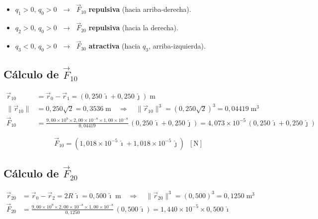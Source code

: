 \documentclass[12pt,letterpaper]{article}
\begin{document}
\begin{itemize}
    \item $q_1 > 0$, $q_0 > 0$ $\;\to\;$ $\vec{F}_{10}$ \textbf{repulsiva} (hacia arriba-derecha).
    \item $q_2 > 0$, $q_0 > 0$ $\;\to\;$ $\vec{F}_{20}$ \textbf{repulsiva} (hacia la derecha).
    \item $q_3 < 0$, $q_0 > 0$ $\;\to\;$ $\vec{F}_{30}$ \textbf{atractiva} (hacia $q_3$,
          arriba-izquierda).
\end{itemize}

\subsection*{C\'alculo de $\vec{F}_{10}$}

\begin{align*}
    \vec{r}_{10} &= \vec{r}_0 - \vec{r}_1 = (0{,}250\,\hat{\imath}+0{,}250\,\hat{\jmath})\;\text{m}\\
    \|\vec{r}_{10}\| &= 0{,}250\sqrt{2} = 0{,}3536\;\text{m}
    \quad\Rightarrow\quad
    \|\vec{r}_{10}\|^3 = (0{,}250\sqrt{2})^3 = 0{,}04419\;\text{m}^3\\
    \vec{F}_{10} &= \frac{9{,}00\times10^9\times2{,}00\times10^{-8}\times1{,}00\times10^{-8}}{0{,}04419}
                   \,(0{,}250\,\hat{\imath}+0{,}250\,\hat{\jmath})
    = 4{,}073\times10^{-5}\,(0{,}250\,\hat{\imath}+0{,}250\,\hat{\jmath})
\end{align*}

\begin{equation*}
    \boxed{\vec{F}_{10} = (1{,}018\times10^{-5}\,\hat{\imath}+1{,}018\times10^{-5}\,\hat{\jmath})\;\;[\text{N}]}
\end{equation*}

\subsection*{C\'alculo de $\vec{F}_{20}$}

\begin{align*}
    \vec{r}_{20} &= \vec{r}_0 - \vec{r}_2 = 2R\,\hat{\imath} = 0{,}500\,\hat{\imath}\;\text{m}
    \quad\Rightarrow\quad \|\vec{r}_{20}\|^3 = (0{,}500)^3 = 0{,}1250\;\text{m}^3\\
    \vec{F}_{20} &= \frac{9{,}00\times10^9\times2{,}00\times10^{-8}\times1{,}00\times10^{-8}}{0{,}1250}
                   \,(0{,}500\,\hat{\imath})
    = 1{,}440\times10^{-5}\times0{,}500\,\hat{\imath}
\end{align*}
\end{document}
